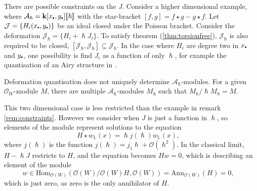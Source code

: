     \begin{rem}
    \label{rem:constraints}
    There are possible constraints on the \(J\). Consider a higher dimensional example, where  \( \mathcal{A}_{\hslash}= \mathbf{k}[x_{\sbt},y_{\sbt}] \lBrack \hslash \rBrack\) with the star-bracket \( [f,g] = f \star g - g \star f \). Let \( \mathcal{J} = \{H_i(x_{\sbt},y_{\sbt})\} \) be an ideal closed under the Poisson bracket. Consider the deformation \(\mathcal{J}_{\hslash} = \{ H_i + \hslash J_i \}\). To satisfy theorem (\ref{thm:torsionfree}), \(\mathcal{J}_{\hslash}\) is also required to be closed, \( [\mathcal{J}_{\hslash}, \mathcal{J}_{\hslash} ] \subseteq \mathcal{J}_{\hslash}\). In the case where \(H_i\) are degree two in \(x_{\sbt}\) and \( y_{\sbt}\), one possibility is  find \( J_i\) as a function of only \(\hslash\), for example the quantisation of an Airy structure in \cite{ks_airy}.
    \end{rem}
    
    \begin{rem}
    Deformation quantisation does not uniquely determine \( \mathcal{A}_{\hslash}\)-modules. For a given \( \mathcal{O}_W\)-module \(M\), there are multiple \( \mathcal{A}_{\hslash}\)-modules \(M_{\hslash}\) such that \(M_{\hslash}/\hslash M_{\hslash} = M\).
    \end{rem}
    This two dimensional case is less restricted than the example in remark \ref{rem:constraints}. However we consider when \(J\) is just a function in \(\hslash\), so elements of the module represent solutions to the equation
    \[ H \star w_{\mathbb{L}}(x) = \hslash j(\hslash) w_{\mathbb{L}}(x), \]
    where \( j(\hslash) \) is the function \( j(\hslash) = j_1 \hslash  + \mathcal{O}(\hslash^2)\). In the classical limit, \(H - \hslash J\) restricts to \( H\), and the equation becomes \( H w =0\), which is describing an element of the module 
    \[ w \in \mathrm{Hom}_{\mathcal{O}(W)}(\mathcal{O}(W)/  \mathcal{O}(W) H , \mathcal{O}(W) ) = \mathrm{Ann}_{\mathcal{O}(W)}(  H) =  0,\]
    which is just zero, as zero is the only annihilator of \(H\).
    
